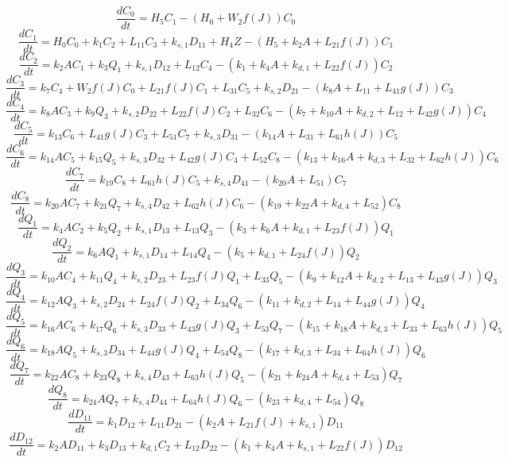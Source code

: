 \[\dfrac{dC_{0}}{dt}=H_{5}C_{1}-\left(H_{0}+W_{2}f\left(J\right)\right)C_{0}\]
\[\dfrac{dC_{1}}{dt}=H_{0}C_{0}+k_{1}C_{2}+L_{11}C_{3}+k_{s,1}D_{11}+H_{4}Z-\left(H_{5}+k_{2}A+L_{21}f\left(J\right)\right)C_{1}\]
\[\dfrac{dC_{2}}{dt}=k_{2}AC_{1}+k_{3}Q_{1}+k_{s,1}D_{12}+L_{12}C_{4}-\left(k_{1}+k_{4}A+k_{d,1}+L_{22}f\left(J\right)\right)C_{2}\]
\[\dfrac{dC_{3}}{dt}=k_{7}C_{4}+W_{2}f\left(J\right)C_{0}+L_{21}f\left(J\right)C_{1}+L_{31}C_{5}+k_{s,2}D_{21}-\left(k_{8}A+L_{11}+L_{41}g\left(J\right)\right)C_{3}\]
\[\dfrac{dC_{4}}{dt}=k_{8}AC_{3}+k_{9}Q_{3}+k_{s,2}D_{22}+L_{22}f\left(J\right)C_{2}+L_{32}C_{6}-\left(k_{7}+k_{10}A+k_{d,2}+L_{12}+L_{42}g\left(J\right)\right)C_{4}\]
\[\dfrac{dC_{5}}{dt}=k_{13}C_{6}+L_{41}g\left(J\right)C_{3}+L_{51}C_{7}+k_{s,3}D_{31}-\left(k_{14}A+L_{31}+L_{61}h\left(J\right)\right)C_{5}\]
\[\dfrac{dC_{6}}{dt}=k_{14}AC_{5}+k_{15}Q_{5}+k_{s,3}D_{32}+L_{42}g\left(J\right)C_{4}+L_{52}C_{8}-\left(k_{13}+k_{16}A+k_{d,3}+L_{32}+L_{62}h\left(J\right)\right)C_{6}\]
\[\dfrac{dC_{7}}{dt}=k_{19}C_{8}+L_{61}h\left(J\right)C_{5}+k_{s,4}D_{41}-\left(k_{20}A+L_{51}\right)C_{7}\]
\[\dfrac{dC_{8}}{dt}=k_{20}AC_{7}+k_{21}Q_{7}+k_{s,4}D_{42}+L_{62}h\left(J\right)C_{6}-\left(k_{19}+k_{22}A+k_{d,4}+L_{52}\right)C_{8}\]
\[\dfrac{dQ_{1}}{dt}=k_{4}AC_{2}+k_{5}Q_{2}+k_{s,1}D_{13}+L_{13}Q_{3}-\left(k_{3}+k_{6}A+k_{d,1}+L_{23}f\left(J\right)\right)Q_{1}\]
\[\dfrac{dQ_{2}}{dt}=k_{6}AQ_{1}+k_{s,1}D_{14}+L_{14}Q_{4}-\left(k_{5}+k_{d,1}+L_{24}f\left(J\right)\right)Q_{2}\]
\[\dfrac{dQ_{3}}{dt}=k_{10}AC_{4}+k_{11}Q_{4}+k_{s,2}D_{23}+L_{23}f\left(J\right)Q_{1}+L_{33}Q_{5}-\left(k_{9}+k_{12}A+k_{d,2}+L_{13}+L_{43}g\left(J\right)\right)Q_{3}\]
\[\dfrac{dQ_{4}}{dt}=k_{12}AQ_{3}+k_{s,2}D_{24}+L_{24}f\left(J\right)Q_{2}+L_{34}Q_{6}-\left(k_{11}+k_{d,2}+L_{14}+L_{44}g\left(J\right)\right)Q_{4}\]
\[\dfrac{dQ_{5}}{dt}=k_{16}AC_{6}+k_{17}Q_{6}+k_{s,3}D_{33}+L_{43}g\left(J\right)Q_{3}+L_{53}Q_{7}-\left(k_{15}+k_{18}A+k_{d,3}+L_{33}+L_{63}h\left(J\right)\right)Q_{5}\]
\[\dfrac{dQ_{6}}{dt}=k_{18}AQ_{5}+k_{s,3}D_{34}+L_{44}g\left(J\right)Q_{4}+L_{54}Q_{8}-\left(k_{17}+k_{d,3}+L_{34}+L_{64}h\left(J\right)\right)Q_{6}\]
\[\dfrac{dQ_{7}}{dt}=k_{22}AC_{8}+k_{23}Q_{8}+k_{s,4}D_{43}+L_{63}h\left(J\right)Q_{5}-\left(k_{21}+k_{24}A+k_{d,4}+L_{53}\right)Q_{7}\]
\[\dfrac{dQ_{8}}{dt}=k_{24}AQ_{7}+k_{s,4}D_{44}+L_{64}h\left(J\right)Q_{6}-\left(k_{23}+k_{d,4}+L_{54}\right)Q_{8}\]
\[\dfrac{dD_{11}}{dt}=k_{1}D_{12}+L_{11}D_{21}-\left(k_{2}A+L_{21}f\left(J\right)+k_{s,1}\right)D_{11}\]
\[\dfrac{dD_{12}}{dt}=k_{2}AD_{11}+k_{3}D_{13}+k_{d,1}C_{2}+L_{12}D_{22}-\left(k_{1}+k_{4}A+k_{s,1}+L_{22}f\left(J\right)\right)D_{12}\]
